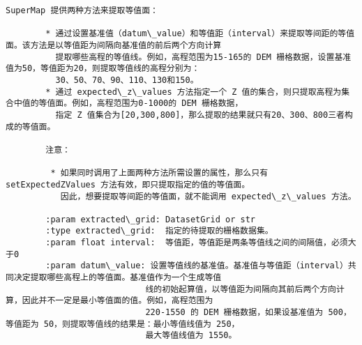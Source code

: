 \documentclass[11pt]{article}
\begin{document}
\begin{Verbatim}[commandchars=\\\{\}]
        SuperMap 提供两种方法来提取等值面：
        
        * 通过设置基准值（datum\_value）和等值距（interval）来提取等间距的等值面。该方法是以等值距为间隔向基准值的前后两个方向计算
          提取哪些高程的等值线。例如，高程范围为15-165的 DEM 栅格数据，设置基准值为50，等值距为20，则提取等值线的高程分别为：
          30、50、70、90、110、130和150。
        * 通过 expected\_z\_values 方法指定一个 Z 值的集合，则只提取高程为集合中值的等值面。例如，高程范围为0-1000的 DEM 栅格数据，
          指定 Z 值集合为[20,300,800]，那么提取的结果就只有20、300、800三者构成的等值面。
        
        注意：
        
         * 如果同时调用了上面两种方法所需设置的属性，那么只有 setExpectedZValues 方法有效，即只提取指定的值的等值面。
           因此，想要提取等间距的等值面，就不能调用 expected\_z\_values 方法。
        
        :param extracted\_grid: DatasetGrid or str
        :type extracted\_grid:  指定的待提取的栅格数据集。
        :param float interval:  等值距，等值距是两条等值线之间的间隔值，必须大于0
        :param datum\_value: 设置等值线的基准值。基准值与等值距（interval）共同决定提取哪些高程上的等值面。基准值作为一个生成等值
                            线的初始起算值，以等值距为间隔向其前后两个方向计算，因此并不一定是最小等值面的值。例如，高程范围为
                            220-1550 的 DEM 栅格数据，如果设基准值为 500，等值距为 50，则提取等值线的结果是：最小等值线值为 250，
                            最大等值线值为 1550。
        

\end{Verbatim}
\end{document}
